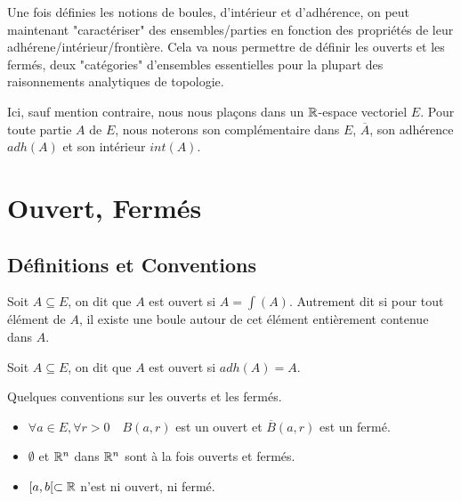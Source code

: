 
\minitoc  %

Une fois définies les notions de boules, d'intérieur et d'adhérence, on peut maintenant "caractériser" 
des ensembles/parties en fonction des propriétés de leur adhérene/intérieur/frontière. 
Cela va nous permettre de définir les ouverts et les fermés, deux "catégories" d'ensembles essentielles pour 
la plupart des raisonnements analytiques de topologie. 

\vspace{0.3cm}

Ici, sauf mention contraire, nous nous plaçons dans un $\mathbb{R}$-espace vectoriel $E$. 
Pour toute partie $A$ de $E$, nous noterons son complémentaire dans $E$, $\overline{A}$, 
son adhérence $adh(A)$ et son intérieur $int(A)$. 


\section{Ouvert, Fermés}

\subsection{Définitions et Conventions}

\begin{definition}
    Soit $A \subseteq E$, on dit que $A$ est ouvert si $A = \int(A)$. 
    Autrement dit si pour tout élément de $A$, il existe une boule autour de cet élément entièrement 
    contenue dans $A$. 
\end{definition}

\begin{definition}
    Soit $A \subseteq E$, on dit que $A$ est ouvert si $adh(A) = A$. 
\end{definition}

\begin{remark}
    Quelques conventions sur les ouverts et les fermés. 
    \begin{itemize}
        \item $ \forall a \in E, \forall r > 0 \quad B(a,r)$ est un ouvert et $\overline{B}(a,r)$ est un fermé. 
        \item $\emptyset$ et $\mathbb{R}^n$ dans $\mathbb{R}^n$ sont à la fois ouverts et fermés. 
        \item $[a,b[ \subset \mathbb{R}$ n'est ni ouvert, ni fermé.  
    \end{itemize}
\end{remark}


